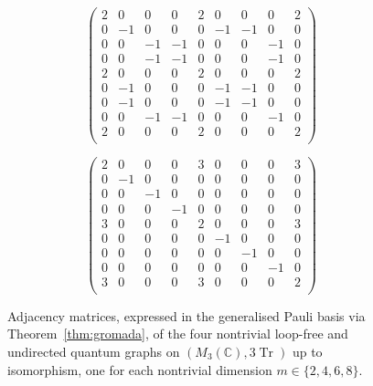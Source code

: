 \begin{figure}[ht]
    \vspace{0.5cm}

    \begin{minipage}[t]{0.45\textwidth}
        \centering
        \[
            \begin{pmatrix}
                2 & 0  & 0  & 0  & 2 & 0 & 0 & 0 & 2 \\
                0 & -1 & 0  & 0  & 0 & -1 & -1 & 0 & 0 \\
                0 & 0  & -1 & -1  & 0 & 0 & 0 & -1 & 0 \\
                0 & 0  & -1  & -1 & 0 & 0 & 0 & -1 & 0 \\
                2 & 0  & 0  & 0  & 2 & 0 & 0 & 0 & 2 \\
                0 & -1  & 0  & 0  & 0 & -1 & -1 & 0 & 0 \\
                0 & -1  & 0  & 0  & 0 & -1 & -1 & 0 & 0 \\
                0 & 0  & -1  & -1  & 0 & 0 & 0 & -1 & 0 \\
                2 & 0  & 0  & 0  & 2 & 0 & 0 & 0 & 2 \\
            \end{pmatrix}
        \]
    \end{minipage}\hfill
    \begin{minipage}[t]{0.45\textwidth}
        \centering
        \[
            \begin{pmatrix}
                2 & 0  & 0  & 0  & 3 & 0 & 0 & 0 & 3 \\
                0 & -1 & 0  & 0  & 0 & 0 & 0 & 0 & 0 \\
                0 & 0  & -1 & 0  & 0 & 0 & 0 & 0 & 0 \\
                0 & 0  & 0  & -1 & 0 & 0 & 0 & 0 & 0 \\
                3 & 0  & 0  & 0  & 2 & 0 & 0 & 0 & 3 \\
                0 & 0  & 0  & 0  & 0 & -1 & 0 & 0 & 0 \\
                0 & 0  & 0  & 0  & 0 & 0 & -1 & 0 & 0 \\
                0 & 0  & 0  & 0  & 0 & 0 & 0 & -1 & 0 \\
                3 & 0  & 0  & 0  & 3 & 0 & 0 & 0 & 2 \\
            \end{pmatrix}
        \]
    \end{minipage}
    \caption{Adjacency matrices, expressed in the generalised Pauli basis
        via Theorem~\ref{thm:gromada}, of the four nontrivial loop-free and
        undirected quantum graphs on \( (M_3(\mathbb{C}),
        3\operatorname{Tr}) \) up to
        isomorphism, one for each nontrivial dimension
    \( m \in \{2,4,6,8\} \).}
    \label{fig:four-matrices-m3}
\end{figure}
